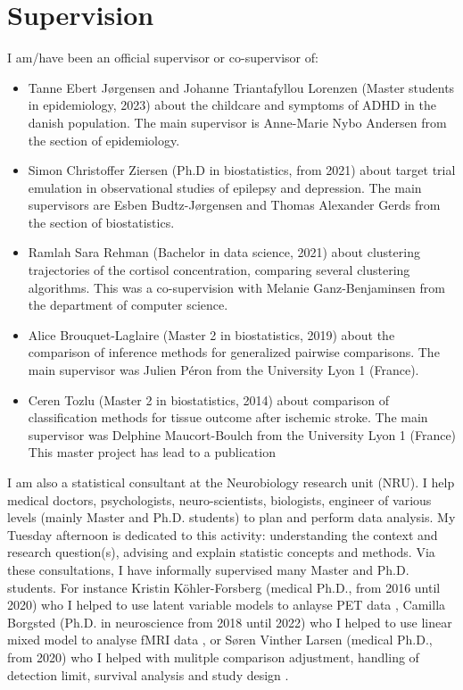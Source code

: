 \documentclass[12pt]{article}
\begin{document}

\section{Supervision}
\label{sec:orgd9f855a}

I am/have been an official supervisor or co-supervisor of:
\begin{itemize}
\item Tanne Ebert Jørgensen and Johanne Triantafyllou Lorenzen (Master
students in epidemiology, 2023) about the childcare and symptoms of
ADHD in the danish population. The main supervisor is Anne-Marie
Nybo Andersen from the section of epidemiology.
\item Simon Christoffer Ziersen (Ph.D in biostatistics, from 2021) about
target trial emulation in observational studies of epilepsy and
depression. The main supervisors are Esben Budtz-Jørgensen and
Thomas Alexander Gerds from the section of biostatistics.
\item Ramlah Sara Rehman (Bachelor in data science, 2021) about clustering
trajectories of the cortisol concentration, comparing several
clustering algorithms. This was a co-supervision with Melanie
Ganz-Benjaminsen from the department of computer science.
\item Alice Brouquet-Laglaire (Master 2 in biostatistics, 2019) about the
comparison of inference methods for generalized pairwise
comparisons. The main supervisor was Julien Péron from the
University Lyon 1 (France).
\item Ceren Tozlu (Master 2 in biostatistics, 2014) about comparison of
classification methods for tissue outcome after ischemic stroke. The
main supervisor was Delphine Maucort-Boulch from the University Lyon
1 (France) This master project has lead to a publication
\citep{tozlu2019comparison}
\end{itemize}

\bigskip

I am also a statistical consultant at the Neurobiology research unit
(NRU). I help medical doctors, psychologists, neuro-scientists,
biologists, engineer of various levels (mainly Master and
Ph.D. students) to plan and perform data analysis. My Tuesday
afternoon is dedicated to this activity: understanding the context and
research question(s), advising and explain statistic concepts and
methods. \newline Via these consultations, I have informally
supervised many Master and Ph.D. students. For instance Kristin
Köhler-Forsberg (medical Ph.D., from 2016 until 2020) who I helped to
use latent variable models to anlayse PET data
\citep{kohler2023serotonin,kohler2022concurrent}, Camilla Borgsted
(Ph.D. in neuroscience from 2018 until 2022) who I helped to use
linear mixed model to analyse fMRI data \citep{borgsted2018amygdala}, or
Søren Vinther Larsen (medical Ph.D., from 2020) who I helped with
mulitple comparison adjustment, handling of detection limit, survival
analysis and study design \citep{larsen2020oral,larsen2022impact}.
\end{document}
